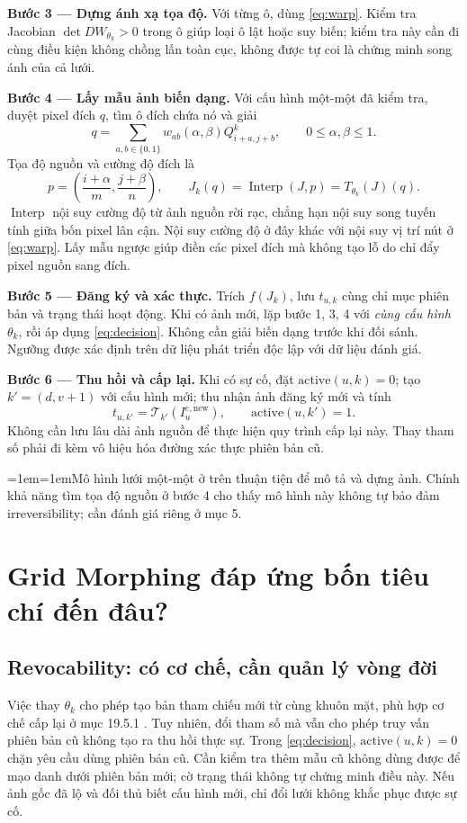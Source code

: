 \documentclass[11pt,a4paper]{article}
\newcommand{\Tpl}{\mathcal{T}}
\newcommand{\Interp}{\operatorname{Interp}}
\newcommand{\note}[1]{\par\begingroup\small\color{teal!65!black}\leftskip=1em\rightskip=1em\noindent#1\par\endgroup}
\begin{document}
\textbf{Bước 3 --- Dựng ánh xạ tọa độ.} Với từng ô, dùng \eqref{eq:warp}. Kiểm tra Jacobian $\det DW_{\theta_k}>0$ trong ô giúp loại ô lật hoặc suy biến; kiểm tra này cần đi cùng điều kiện không chồng lấn toàn cục, không được tự coi là chứng minh song ánh của cả lưới.

\textbf{Bước 4 --- Lấy mẫu ảnh biến dạng.} Với cấu hình một-một đã kiểm tra, duyệt pixel đích $q$, tìm ô đích chứa nó và giải
\begin{equation}\label{eq:inverse}
 q=\sum_{a,b\in\{0,1\}}w_{ab}(\alpha,\beta)Q_{i+a,j+b}^k,
 \qquad 0\leq\alpha,\beta\leq1.
\end{equation}
Tọa độ nguồn và cường độ đích là
\begin{equation}\label{eq:render}
 p=\left(\frac{i+\alpha}{m},\frac{j+\beta}{n}\right),\qquad
 J_k(q)=\Interp(J,p)=T_{\theta_k}(J)(q).
\end{equation}
$\Interp$ nội suy cường độ từ ảnh nguồn rời rạc, chẳng hạn nội suy song tuyến tính giữa bốn pixel lân cận. Nội suy cường độ ở đây khác với nội suy vị trí nút ở \eqref{eq:warp}. Lấy mẫu ngược giúp điền các pixel đích mà không tạo lỗ do chỉ đẩy pixel nguồn sang đích.

\textbf{Bước 5 --- Đăng ký và xác thực.} Trích $f(J_k)$, lưu $t_{u,k}$ cùng chỉ mục phiên bản và trạng thái hoạt động. Khi có ảnh mới, lặp bước 1, 3, 4 với \emph{cùng cấu hình} $\theta_k$, rồi áp dụng \eqref{eq:decision}. Không cần giải biến dạng trước khi đối sánh. Ngưỡng được xác định trên dữ liệu phát triển độc lập với dữ liệu đánh giá.

\textbf{Bước 6 --- Thu hồi và cấp lại.} Khi có sự cố, đặt $\mathrm{active}(u,k)=0$; tạo $k'=(d,v+1)$ với cấu hình mới; thu nhận ảnh đăng ký mới và tính
\begin{equation}
 t_{u,k'}=\Tpl_{k'}(I_u^{e,\mathrm{new}}),\qquad \mathrm{active}(u,k')=1.
\end{equation}
Không cần lưu lâu dài ảnh nguồn để thực hiện quy trình cấp lại này. Thay tham số phải đi kèm vô hiệu hóa đường xác thực phiên bản cũ.

\note{Mô hình lưới một-một ở trên thuận tiện để mô tả và dựng ảnh. Chính khả năng tìm tọa độ nguồn ở bước 4 cho thấy mô hình này không tự bảo đảm irreversibility; cần đánh giá riêng ở mục 5.}

\newpage
\section{Grid Morphing đáp ứng bốn tiêu chí đến đâu?}
\subsection{Revocability: có cơ chế, cần quản lý vòng đời}
Việc thay $\theta_k$ cho phép tạo bản tham chiếu mới từ cùng khuôn mặt, phù hợp cơ chế cấp lại ở mục 19.5.1 \cite{adler}. Tuy nhiên, đổi tham số mà vẫn cho phép truy vấn phiên bản cũ không tạo ra thu hồi thực sự. Trong \eqref{eq:decision}, $\mathrm{active}(u,k)=0$ chặn yêu cầu dùng phiên bản cũ. Cần kiểm tra thêm mẫu cũ không dùng được để mạo danh dưới phiên bản mới; cờ trạng thái không tự chứng minh điều này. Nếu ảnh gốc đã lộ và đối thủ biết cấu hình mới, chỉ đổi lưới không khắc phục được sự cố.
\end{document}
